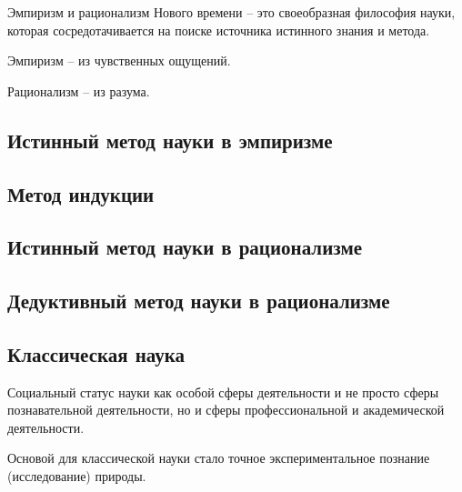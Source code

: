 \documentclass[main.tex]{subfiles}
\begin{document}
Эмпиризм и рационализм Нового времени -- это своеобразная философия науки, которая сосредотачивается на поиске источника истинного знания и метода.

Эмпиризм -- из чувственных ощущений.

Рационализм -- из разума.

\subsection{Истинный метод науки в эмпиризме}


\subsection{Метод индукции}


\subsection{Истинный метод науки в рационализме}


\subsection{Дедуктивный метод науки в рационализме}


\subsection{Классическая наука}


Социальный статус науки как особой сферы деятельности и не просто сферы познавательной деятельности, но и сферы профессиональной и академической деятельности.

Основой для классической науки стало точное экспериментальное познание (исследование) природы.
\end{document}
